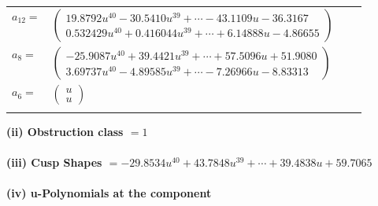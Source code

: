 \documentclass[1p]{elsarticle_modified}
\theoremstyle{definition}
\begin{document}
\begin{tabular}{m{7pt} m{180pt} m{7pt} m{180pt} }
\flushright $a_{12}=$&$\begin{pmatrix}19.8792 u^{40}-30.5410 u^{39}+\cdots-43.1109 u-36.3167\\0.532429 u^{40}+0.416044 u^{39}+\cdots+6.14888 u-4.86655\end{pmatrix}$ \\
\flushright $a_{8}=$&$\begin{pmatrix}-25.9087 u^{40}+39.4421 u^{39}+\cdots+57.5096 u+51.9080\\3.69737 u^{40}-4.89585 u^{39}+\cdots-7.26966 u-8.83313\end{pmatrix}$ \\
\flushright $a_{6}=$&$\begin{pmatrix}u\\u\end{pmatrix}$\\&\end{tabular}
\flushleft \textbf{(ii) Obstruction class $= 1$}\\~\\
\flushleft \textbf{(iii) Cusp Shapes $= -29.8534 u^{40}+43.7848 u^{39}+\cdots+39.4838 u+59.7065$}\\~\\
\newpage\renewcommand{\arraystretch}{1}
\flushleft \textbf{(iv) u-Polynomials at the component}\newline \\
\end{document}
